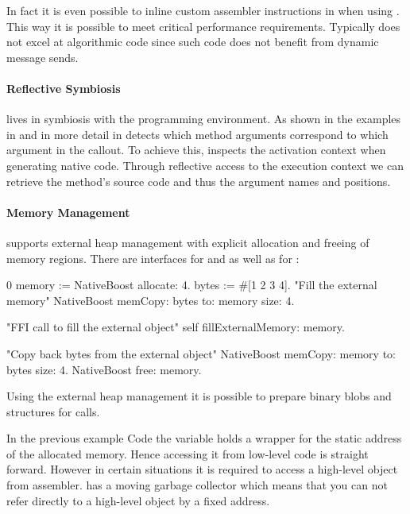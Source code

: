 In fact it is even possible to inline custom assembler instructions in \PH when using \NB.
This way it is possible to meet critical performance requirements.
Typically \ST does not excel at algorithmic code since such code does not benefit from dynamic message sends.

\paragraph{Reflective Symbiosis}

\NB lives in symbiosis with the \PH programming environment.
As shown in the examples in  and in more detail in  \NB detects which method arguments correspond to which argument in the \FFI callout.
To achieve this, \NB inspects the activation context when generating native code.
Through reflective access to the execution context we can retrieve the method's source code and thus the argument names and positions.

\paragraph{Memory Management}


\NB supports external heap management with explicit allocation and freeing of memory regions.
There are interfaces for  and  as well as for :
%
\begin{stcode}[
	label={lst:ffi-externalHeap},
	caption={Example of external heap management in \NB}]{0}
memory := NativeBoost allocate: 4.
bytes  := #[1 2 3 4].
"Fill the external memory"
NativeBoost memCopy: bytes to: memory size: 4.

"FFI call to fill the external object"
self fillExternalMemory: memory.

"Copy back bytes from the external object"
NativeBoost memCopy: memory to: bytes size: 4.
NativeBoost free: memory.
\end{stcode}

Using the external heap management it is possible to prepare binary blobs and structures for \FFI calls.

In the previous example Code  the  variable holds a wrapper for the static address of the allocated memory.
Hence accessing it from low-level code is straight forward.
However in certain situations it is required to access a high-level object from assembler.
\PH has a moving garbage collector which means that you can not refer directly to a high-level object by a fixed address.

